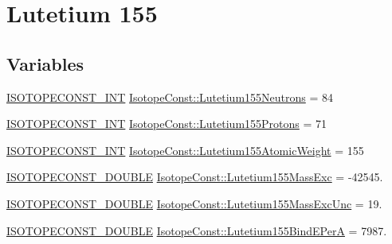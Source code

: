 \hypertarget{group___isotope_const-_lutetium-_lu155}{}\section{Lutetium 155}
\label{group___isotope_const-_lutetium-_lu155}
\subsection*{Variables}
\begin{DoxyCompactItemize}
\item 
\mbox{\hyperlink{group___isotope_const-_macros_ga5f18360b3e99483a35c32d789e62621c}{I\+S\+O\+T\+O\+P\+E\+C\+O\+N\+S\+T\+\_\+\+I\+NT}} \mbox{\hyperlink{group___isotope_const-_lutetium-_lu155_gacd173599ce0fbdc053cfd8737d491df0}{Isotope\+Const\+::\+Lutetium155\+Neutrons}} = 84
\item 
\mbox{\hyperlink{group___isotope_const-_macros_ga5f18360b3e99483a35c32d789e62621c}{I\+S\+O\+T\+O\+P\+E\+C\+O\+N\+S\+T\+\_\+\+I\+NT}} \mbox{\hyperlink{group___isotope_const-_lutetium-_lu155_gaebb89d7890413709e402dba72e5988dd}{Isotope\+Const\+::\+Lutetium155\+Protons}} = 71
\item 
\mbox{\hyperlink{group___isotope_const-_macros_ga5f18360b3e99483a35c32d789e62621c}{I\+S\+O\+T\+O\+P\+E\+C\+O\+N\+S\+T\+\_\+\+I\+NT}} \mbox{\hyperlink{group___isotope_const-_lutetium-_lu155_ga7443cba01ce3d7a600f92bd262e951b3}{Isotope\+Const\+::\+Lutetium155\+Atomic\+Weight}} = 155
\item 
\mbox{\hyperlink{group___isotope_const-_macros_ga8f45a7272ce02c0b4c65c44636ed719a}{I\+S\+O\+T\+O\+P\+E\+C\+O\+N\+S\+T\+\_\+\+D\+O\+U\+B\+LE}} \mbox{\hyperlink{group___isotope_const-_lutetium-_lu155_ga3957cb64295f9058a6ee65eabe823d5b}{Isotope\+Const\+::\+Lutetium155\+Mass\+Exc}} = -\/42545.
\item 
\mbox{\hyperlink{group___isotope_const-_macros_ga8f45a7272ce02c0b4c65c44636ed719a}{I\+S\+O\+T\+O\+P\+E\+C\+O\+N\+S\+T\+\_\+\+D\+O\+U\+B\+LE}} \mbox{\hyperlink{group___isotope_const-_lutetium-_lu155_gad2b14315d37afb8dee50908d12f25011}{Isotope\+Const\+::\+Lutetium155\+Mass\+Exc\+Unc}} = 19.
\item 
\mbox{\hyperlink{group___isotope_const-_macros_ga8f45a7272ce02c0b4c65c44636ed719a}{I\+S\+O\+T\+O\+P\+E\+C\+O\+N\+S\+T\+\_\+\+D\+O\+U\+B\+LE}} \mbox{\hyperlink{group___isotope_const-_lutetium-_lu155_ga9f9d93ab8ae7c8d0a24c8ea7dd91adc3}{Isotope\+Const\+::\+Lutetium155\+Bind\+E\+PerA}} = 7987.
\item 

\end{DoxyCompactItemize}

